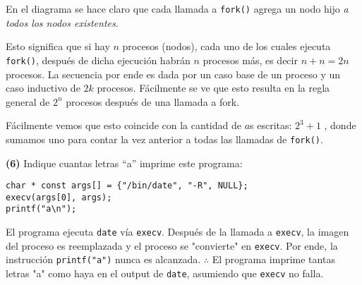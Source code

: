 \documentclass[12pt]{article}
\theoremstyle{definition}
\begin{document}
En el diagrama se hace claro que cada llamada a \texttt{fork()} agrega un nodo
hijo \textit{a todos los nodos existentes}.

Esto significa que si hay $n$ procesos (nodos), cada uno de los cuales ejecuta
\texttt{fork()}, después de dicha ejecución habrán $n$ procesos más, es decir $n
+ n = 2n$ procesos. La secuencia por ende es dada por un caso base de un proceso
y un caso inductivo de $2k$ procesos. Fácilmente se ve que esto resulta en la
regla general de $2^n$ procesos después de una llamada a fork.

Fácilmente vemos que esto coincide con la cantidad de $a$s escritas: $2^3 + 1$ ,
donde sumamos uno para contar la vez anterior a todas las llamadas de
\texttt{fork()}.

\pagebreak 

\begin{shaded}
    \textbf{(6)} Indique cuantas letras “a” imprime este programa:

    \begin{verbatim}
char * const args[] = {"/bin/date", "-R", NULL};
execv(args[0], args);
printf("a\n");
    \end{verbatim}
\end{shaded}

El programa ejecuta \texttt{date} vía \texttt{execv}. Después de la llamada a
\texttt{execv}, la imagen del proceso es reemplazada y el proceso se "convierte"
en \texttt{execv}. Por ende, la instrucción \texttt{printf("a\n")} nunca es
alcanzada. $\therefore $ El programa imprime tantas letras "a" como haya en el
output de \texttt{date}, asumiendo que \texttt{execv} no falla.

\pagebreak 
\end{document}

